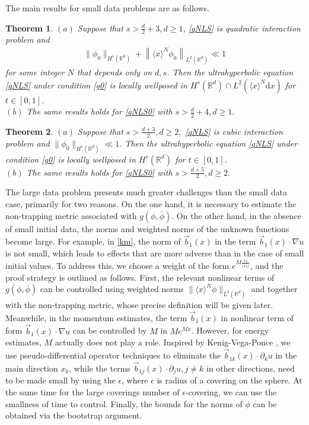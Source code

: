 \documentclass[10pt,twoside,a4paper]{article}
\newtheorem{thm}{Theorem}[section]
\numberwithin{equation}{section}\allowdisplaybreaks
\def\geq{\geqslant}
\begin{document}
The main results for  small data problems are  as follows.
\begin{thm} \label{thm2}
$ 	(a) $ Suppose that    $ s>\frac {d}2+3, d \geq 1  $,  \eqref{qNLS} is  quadratic interaction problem and
\begin{align*}
	   \|\phi_0\|_{H^s(\mathbb{R}^d)} +\left\| \langle x\rangle^N \phi_0 \right\|_{L^2(\mathbb{R}^d)}\ll 1
\end{align*}  
  for   some integer $ N $ that depends only on $ d, s $.   Then  the ultrahyperbolic equation \eqref{qNLS} under condition   \eqref{g0} is locally wellposed in $   H^{s} (\mathbb{R}^d) \cap L^2(\langle x\rangle^N \mathrm{d}x) $ for $ t\in [0,1] $.\\
$ (b) $ The same results holds for \eqref{qNLS0} with $ s>\frac{d}{2}+4, d\geq 1. $
\end{thm}
\begin{thm} \label{thm3}
	$ 	(a) $   Suppose that $  s>\frac {d+3}2, d \geq 2,   $   \eqref{qNLS} is  cubic interaction problem and $ \|\phi_0\|_{H^s(\mathbb{R}^d)}\ll 1 $. Then the ultrahyperbolic equation \eqref{qNLS} under condition   \eqref{g0}  is locally wellposed in $ H^s(\mathbb{R}^d) $  for $t\in  [0,1] $.\\
	$ (b) $ The same results holds for \eqref{qNLS0} with $ s>\frac{d+5}{2}, d\geq 2. $
\end{thm}


The large  data problem presents much greater  challenges than the small   data case, primarily for two reasons.  On the one hand, it is necessary to estimate the non-trapping metric associated with  \( g(\phi, \overline{\phi}) \).  On the other hand, in the absence of small initial data, the norms and weighted norms of the unknown functions become large. For example, in \eqref{km}, the norm of \( \vec{b}_1(x) \) in the term \(\vec{b}_1(x) \cdot \nabla u \)  is not small, which leads to effects that are more adverse than in the case of small initial values. To address this, we choose a weight of the form \( e^{M \frac{x_k}{\langle x_k\rangle} } \), and the proof strategy is outlined as follows. First, the relevant nonlinear terms of \( g(\phi, \overline{\phi}) \) can be controlled using  weighted norms $ \|\langle x\rangle ^N \phi \|_{L^2(\mathbb{R}^d)} $ and together with the non-trapping metric, whose precise definition will be given later. Meanwhile, in the momentum estimates, the term \( \vec{b}_1(x) \) in nonlinear term of form  \( \vec{b}_1(x) \cdot \nabla u \) can be controlled by \( M \) in \( M e^{Mx} \). However, for energy estimates, \( M \) actually does not play a role. Inspired by Kenig-Vega-Ponce \cite{kenig2004cauchy},  we use pseudo-differential operator techniques to eliminate the \( \vec{b}_{1k}(x) \cdot \partial_k u \) in the main direction \( x_k \), while the terms \(\vec{b}_{1j}(x) \cdot \partial_j u,j \neq k \) in other directions, need to be made small by using the \( \epsilon \), where \( \epsilon \) is radius of a covering on the sphere. At the same time for  the large coverings  number of \( \epsilon \)-covering, we can use the smallness of time to control.  Finally, the bounds for the norms of \( \phi \) can be obtained via the bootstrap argument.
\end{document}
